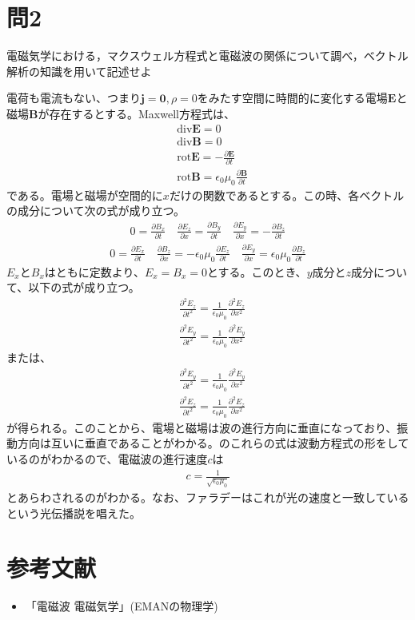 \documentclass[pdflatex,ja=standard,fleqn]{bxjsarticle}
\begin{document}
\section*{問2}
\begin{screen}
    電磁気学における，マクスウェル方程式と電磁波の関係について調べ，ベクトル解析の知識を用いて記述せよ
\end{screen}
電荷も電流もない、つまり$\boldsymbol{j}=\boldsymbol{0},\rho=0$をみたす空間に時間的に変化する電場$\boldsymbol{E}$と磁場$\boldsymbol{B}$が存在するとする。Maxwell方程式は、
\begin{align*}
    &{\mathrm{div}}\boldsymbol{E}=0\\
    &{\mathrm{div}}\boldsymbol{B}=0\\
    &{\mathrm{rot}}\boldsymbol{E}=-\frac{\partial\boldsymbol{E}}{\partial t}\\
    &{\mathrm{rot}}\boldsymbol{B}=\epsilon_{0}\mu_{0}\frac{\partial\boldsymbol{B}}{\partial t}
\end{align*}
である。電場と磁場が空間的に$x$だけの関数であるとする。この時、各ベクトルの成分について次の式が成り立つ。
\begin{eqnarray*}
    0=\frac{\partial B_{x}}{\partial t}\quad
    \frac{\partial E_{z}}{\partial x}=\frac{\partial B_{y}}{\partial t}\quad
    \frac{\partial E_{y}}{\partial x}=-\frac{\partial B_{z}}{\partial t}
\end{eqnarray*}
\begin{eqnarray*}
    0=\frac{\partial E_{x}}{\partial t}\quad
    \frac{\partial B_{z}}{\partial x}=-\epsilon_{0}\mu_{0}\frac{\partial E_{z}}{\partial t}\quad
    \frac{\partial E_{y}}{\partial x}=\epsilon_{0}\mu_{0}\frac{\partial B_{z}}{\partial t}
\end{eqnarray*}
$E_{x}$と$B_{x}$はともに定数より、$E_{x}=B_{x}=0$とする。このとき、$y$成分と$z$成分について、以下の式が成り立つ。
\begin{align*}
        &\frac{\partial^2E_{z}}{\partial t^2}=\frac{1}{\epsilon_{0}\mu_{0}}\frac{\partial^2 E_{z}}{\partial x^2}\\
        &\frac{\partial^2E_{y}}{\partial t^2}=\frac{1}{\epsilon_{0}\mu_{0}}\frac{\partial^2 E_{y}}{\partial x^2}
\end{align*}
または、
\begin{align*}
    &\frac{\partial^2E_{y}}{\partial t^2}=\frac{1}{\epsilon_{0}\mu_{0}}\frac{\partial^2 E_{y}}{\partial x^2}\\
    &\frac{\partial^2E_{z}}{\partial t^2}=\frac{1}{\epsilon_{0}\mu_{0}}\frac{\partial^2 E_{z}}{\partial x^2}
\end{align*}
が得られる。このことから、電場と磁場は波の進行方向に垂直になっており、振動方向は互いに垂直であることがわかる。のこれらの式は波動方程式の形をしているのがわかるので、電磁波の進行速度$c$は
\begin{eqnarray*}
    c=\frac{1}{\sqrt{\epsilon_{0}\mu_{0}}}
\end{eqnarray*}
とあらわされるのがわかる。なお、ファラデーはこれが光の速度と一致しているという光伝播説を唱えた。
\section*{参考文献}
\begin{itemize}
    \item 「電磁波 電磁気学」(EMANの物理学)
\end{itemize}
\end{document}
